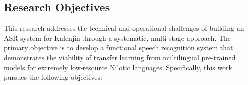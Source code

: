 \documentclass[journal]{IEEEtran}
\begin{document}
\subsection{Research Objectives}

This research addresses the technical and operational challenges of building an ASR system for Kalenjin through a systematic, multi-stage approach. The primary objective is to develop a functional speech recognition system that demonstrates the viability of transfer learning from multilingual pre-trained models for extremely low-resource Nilotic languages. Specifically, this work pursues the following objectives:
\end{document}
